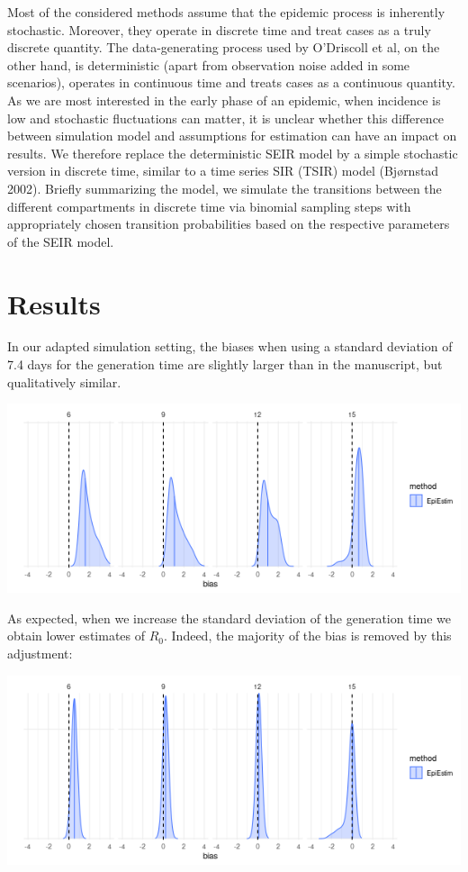 \documentclass{article}
\begin{document}
Most of the considered methods assume that the epidemic process is inherently stochastic. Moreover, they operate in discrete time and treat cases as a truly discrete quantity. The data-generating process used by O'Driscoll et al, on the other hand, is deterministic (apart from observation noise added in some scenarios), operates in continuous time and treats cases as a continuous quantity. As we are most interested in the early phase of an epidemic, when incidence is low and stochastic fluctuations can matter, it is unclear whether this difference between simulation model and assumptions for estimation can have an impact on results. We therefore replace the deterministic SEIR model by a simple stochastic version in discrete time, similar to a time series SIR (TSIR) model (Bj{\o}rnstad 2002). Briefly summarizing the model, we simulate the transitions between the different compartments in discrete time via binomial sampling steps with appropriately chosen transition probabilities based on the respective parameters of the SEIR model.

\section{Results}

In our adapted simulation setting, the biases when using a standard deviation of 7.4 days for the generation time are slightly larger than in the manuscript, but qualitatively similar.

\includegraphics[scale=0.53]{figures/bias_7.png}

As expected, when we increase the standard deviation of the generation time we obtain lower estimates of $R_0$. Indeed, the majority of the bias is removed by this adjustment:

\includegraphics[scale=0.53]{figures/bias_15.png}
\end{document}
